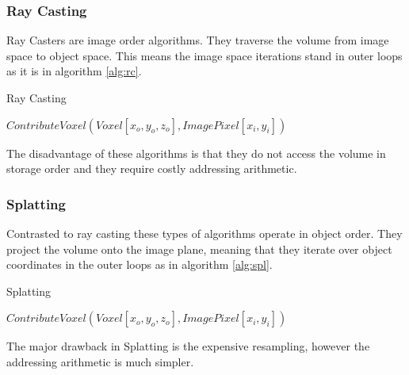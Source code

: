 \documentclass[a4paper,12pt]{article}
\begin{document}
\subsubsection{Ray Casting} 

Ray Casters are image order algorithms. They traverse the volume from
image space to object space. This means the image
space iterations stand in outer loops as it is in algorithm
\ref{alg:rc}.

\begin{algorithm}
\caption{Ray Casting}
\label{alg:rc}
\begin{algorithmic}
       
  
  \STATE $ContributeVoxel(Voxel[x_o,y_o,z_o],ImagePixel[x_i,y_i])$
  \ENDFOR \ENDFOR \ENDFOR \ENDFOR \ENDFOR \ENDFOR
\end{algorithmic}
\end{algorithm}

The disadvantage of these algorithms is that they do not access the
volume in storage order and they require costly addressing
arithmetic.

\subsubsection{Splatting}

Contrasted to ray casting these types of algorithms operate in object
order. They project the volume onto the image plane, meaning that they
iterate over object coordinates in the outer loops as in algorithm
\ref{alg:spl}.

\begin{algorithm}
\caption{Splatting}
\label{alg:spl}
\begin{algorithmic}
        \STATE
  $ContributeVoxel(Voxel[x_o,y_o,z_o],ImagePixel[x_i,y_i])$ \ENDFOR
  \ENDFOR \ENDFOR \ENDFOR \ENDFOR \ENDFOR
\end{algorithmic}
\end{algorithm}

The major drawback in Splatting is the expensive resampling, however
the addressing arithmetic is much simpler.
\end{document}
